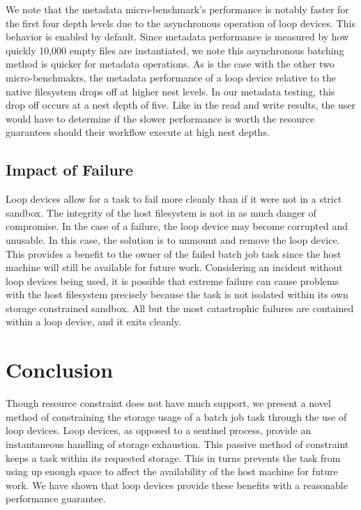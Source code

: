 \documentclass[conference]{IEEEtran}
\begin{document}
We note that the metadata micro-benchmark's performance is notably faster for the first four depth levels due to the asynchronous operation of loop devices. This behavior is enabled by default. Since metadata performance is measured by how quickly 10,000 empty files are instantiated, we note this asynchronous batching method is quicker for metadata operations. As is the case with the other two micro-benchmakrs, the metadata performance of a loop device relative to the native filesystem drops off at higher nest levels. In our metadata testing, this drop off occurs at a nest depth of five. Like in the read and write results, the user would have to determine if the slower performance is worth the resource guarantees should their workflow execute at high nest depths.

\subsection{Impact of Failure}
Loop devices allow for a task to fail more cleanly than if it were not in a strict sandbox. The integrity of the host filesystem is not in as much danger of compromise. In the case of a failure, the loop device may become corrupted and unusable. In this case, the solution is to unmount and remove the loop device. This provides a benefit to the owner of the failed batch job task since the host machine will still be available for future work. Considering an incident without loop devices being used, it is possible that extreme failure can cause problems with the host filesystem precisely because the task is not isolated within its own storage constrained sandbox. All but the most catastrophic failures are contained within a loop device, and it exits cleanly.

\section{Conclusion}
Though resource constraint does not have much support, we present a novel method of constraining the storage usage of a batch job task through the use of loop devices. Loop devices, as opposed to a sentinel process, provide an instantaneous handling of storage exhaustion. This passive method of constraint keeps a task within its requested storage. This in turns prevents the task from using up enough space to affect the availability of the host machine for future work. We have shown that loop devices provide these benefits with a reasonable performance guarantee.
\end{document}
